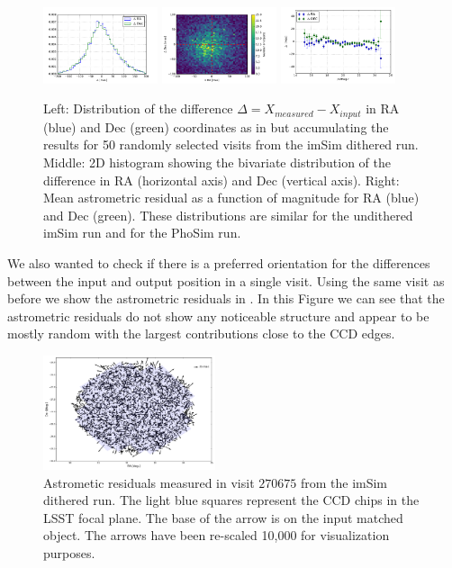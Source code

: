 \documentclass[\docopts]{\docclass}
\begin{document}
\begin{figure}
  \centering
  \includegraphics[width=0.3\textwidth]{astrometry_imsim_dithered_50visits}
  \includegraphics[width=0.3\textwidth]{astrometry_imsim_dithered_50visits_hist2d}
  \includegraphics[width=0.3\textwidth]{astrometry_vs_mag_imsim_50_visits}
  \caption{Left: Distribution of the difference $\Delta=X_{measured}-X_{input}$ in RA (blue) and Dec (green) coordinates as in
   but accumulating the results for 50 randomly selected visits from the imSim dithered run. Middle: 2D histogram
  showing the bivariate distribution of the difference in RA (horizontal axis) and Dec (vertical axis). Right: Mean astrometric residual
  as a function of magnitude for RA (blue) and Dec (green). These distributions are similar for the undithered imSim run and for the PhoSim run.}
  \label{fig:astrometry_b}
\end{figure}

We also wanted to check if there is a preferred orientation for the differences between the input and output position in a single visit. Using the same visit as before we show the astrometric residuals in . In this Figure we can see that the astrometric residuals do not show any noticeable structure and appear to be mostly random with the largest contributions close to the CCD edges.

\begin{figure}
  \centering
  \includegraphics[width=0.45\textwidth]{astrometry_imsim_dithered_interp}
  \caption{Astrometic residuals measured in visit $270675$ from the imSim dithered run. The light blue squares represent the CCD chips in
  the LSST focal plane. The base of the arrow is on the input matched object. The arrows have been re-scaled 10,000 for visualization purposes.}
  \label{fig:astrometry_c}
\end{figure}
\end{document}

